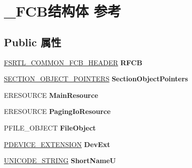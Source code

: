 \hypertarget{struct___f_c_b}{}\section{\+\_\+\+F\+C\+B结构体 参考}
\label{struct___f_c_b}
\subsection*{Public 属性}
\begin{DoxyCompactItemize}
\item 
\mbox{\label{struct___f_c_b_a2dd2011aedb9365c8108712095a3aced}} 
\hyperlink{struct___f_s_r_t_l___c_o_m_m_o_n___f_c_b___h_e_a_d_e_r}{F\+S\+R\+T\+L\+\_\+\+C\+O\+M\+M\+O\+N\+\_\+\+F\+C\+B\+\_\+\+H\+E\+A\+D\+ER} {\bfseries R\+F\+CB}
\item 
\mbox{\label{struct___f_c_b_a8be843238f971f2bb1cc960b056b937d}} 
\hyperlink{struct___s_e_c_t_i_o_n___o_b_j_e_c_t___p_o_i_n_t_e_r_s}{S\+E\+C\+T\+I\+O\+N\+\_\+\+O\+B\+J\+E\+C\+T\+\_\+\+P\+O\+I\+N\+T\+E\+RS} {\bfseries Section\+Object\+Pointers}
\item 
\mbox{\label{struct___f_c_b_af37d15164eec8e2968db3a19b183c912}} 
E\+R\+E\+S\+O\+U\+R\+CE {\bfseries Main\+Resource}
\item 
\mbox{\label{struct___f_c_b_a620755752627e7f89daf06cce2701b2a}} 
E\+R\+E\+S\+O\+U\+R\+CE {\bfseries Paging\+Io\+Resource}
\item 
\mbox{\label{struct___f_c_b_af440f74c92116cf198c738d58cedb669}} 
P\+F\+I\+L\+E\+\_\+\+O\+B\+J\+E\+CT {\bfseries File\+Object}
\item 
\mbox{\label{struct___f_c_b_a55dc0d4de238ec8154264fd4fb57c623}} 
\hyperlink{struct___b_e_e_p___d_e_v_i_c_e___e_x_t_e_n_s_i_o_n}{P\+D\+E\+V\+I\+C\+E\+\_\+\+E\+X\+T\+E\+N\+S\+I\+ON} {\bfseries Dev\+Ext}
\item 
\mbox{\label{struct___f_c_b_aa8510be4599b47bf66ff051197d31884}} 
\hyperlink{struct___u_n_i_c_o_d_e___s_t_r_i_n_g}{U\+N\+I\+C\+O\+D\+E\+\_\+\+S\+T\+R\+I\+NG} {\bfseries Short\+NameU}
\item 
\mbox{\label{struct___f_c_b_aca69cb6f0f983486381a9364a559f200}} 

\end{DoxyCompactItemize}
